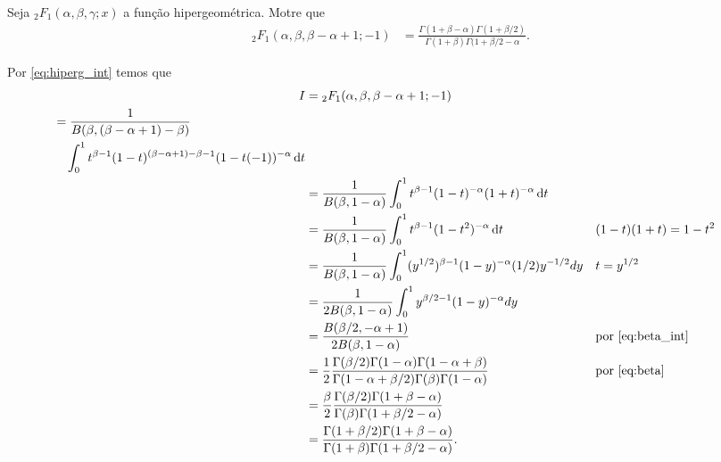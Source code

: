 \documentclass[a4paper,12pt, leqno, answers]{exam}
\begin{document}
\begin{questions}
    \question[P2 de 2011] Seja ${}_2F_1(\alpha, \beta, \gamma; x)$ a fun\c{c}\~{a}o hipergeom\'{e}trica. Motre que
    \begin{align*}
        {}_2F_1(\alpha, \beta, \beta - \alpha + 1; -1) &= \frac{\Gamma(1 + \beta - \alpha) \Gamma(1 + \beta/2)}{\Gamma(1 + \beta) \Gamma(1 + \beta/2 - \alpha}.
    \end{align*}
    \begin{solution}
        Por \eqref{eq:hiperg_int} temos que
        \begin{align*}
            I &= {}_2F_1(\alpha, \beta, \beta - \alpha + 1; -1) \\
            \begin{split}
                 &= \frac{1}{B(\beta, (\beta -\alpha + 1) - \beta)} \\ &\quad \int_0^1 t^{\beta - 1} (1 - t)^{(\beta - \alpha + 1) - \beta - 1} (1 - t(-1))^{-\alpha} \,\mathrm{d}t
            \end{split} \\
            &= \frac{1}{B(\beta, 1 - \alpha)} \int_0^1 t^{\beta - 1} (1 - t)^{-\alpha} (1 + t)^{-\alpha} \,\mathrm{d}t \\
            &= \frac{1}{B(\beta, 1 - \alpha)} \int_0^1 t^{\beta - 1} (1 - t^2)^{-\alpha} \,\mathrm{d}t && (1 - t)(1 + t) = 1 - t^2 \\
            &= \frac{1}{B(\beta, 1 - \alpha)} \int_0^1 (y^{1/2})^{\beta - 1} (1 - y)^{-\alpha} (1 / 2) y^{-1/2} dy && t = y^{1/2} \\
            &= \frac{1}{2 B(\beta, 1 - \alpha)} \int_0^1 y^{\beta / 2 - 1} (1 - y)^{-\alpha} dy \\
            &= \frac{B(\beta / 2, -\alpha + 1)}{2 B(\beta, 1 - \alpha)} && \text{por \eqref{eq:beta_int}} \\
            &= \frac{1}{2} \frac{\Gamma(\beta/2) \Gamma(1 - \alpha) \Gamma(1 - \alpha + \beta)}{\Gamma(1 - \alpha + \beta/2) \Gamma(\beta) \Gamma(1 - \alpha)} && \text{por \eqref{eq:beta}} \\
            &= \frac{\beta}{2} \frac{\Gamma(\beta / 2) \Gamma(1 + \beta - \alpha)}{\Gamma(\beta) \Gamma(1 + \beta / 2 - \alpha)} \\
            &= \frac{\Gamma(1 + \beta / 2) \Gamma(1 + \beta - \alpha)}{\Gamma(1 + \beta) \Gamma(1 + \beta / 2 - \alpha)}.
        \end{align*}
    \end{solution}


\end{questions}
\end{document}
